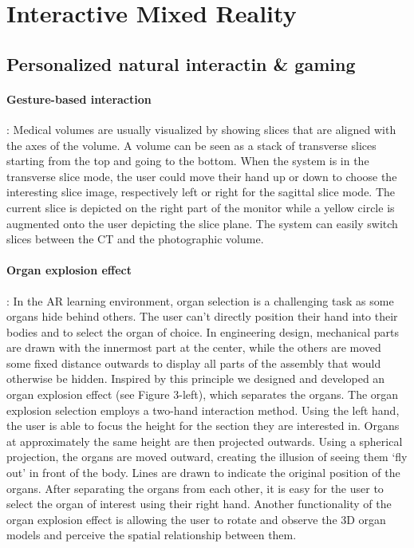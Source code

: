 \section{Interactive Mixed Reality}


\subsection{Personalized natural interactin \& gaming}

\paragraph{Gesture-based interaction}: Medical volumes are usually visualized by showing slices that are aligned with the axes of the volume. A volume can be seen as a stack of transverse slices starting from the top and going to the bottom. When the system is in the transverse slice mode, the user could move their hand up or down to choose the interesting slice image, respectively left or right for the sagittal slice mode. The current slice is depicted on the right part of the monitor while a yellow circle is augmented onto the user depicting the slice plane. The system can easily switch slices between the CT and the photographic volume.

\paragraph{Organ explosion effect}: In the AR learning environment, organ selection is a challenging task as some organs hide behind others. The user can’t directly position their hand into their bodies and to select the organ of choice. In engineering design, mechanical parts are drawn with the innermost part at the center, while the others are moved some fixed distance outwards to display all parts of the assembly that would otherwise be hidden. Inspired by this principle we designed and developed an organ explosion effect (see Figure 3-left), which separates the organs. The organ explosion selection employs a two-hand interaction method. Using the left hand, the user is able to focus the height for the section they are interested in. Organs at approximately the same height are then projected outwards. Using a spherical projection, the organs are moved outward, creating the illusion of seeing them ‘fly out’ in front of the body. Lines are drawn to indicate the original position of the organs. After separating the organs from each other, it is easy for the user to select the organ of interest using their right hand. Another functionality of the organ explosion effect is allowing the user to rotate and observe the 3D organ models and perceive the spatial relationship between them.

